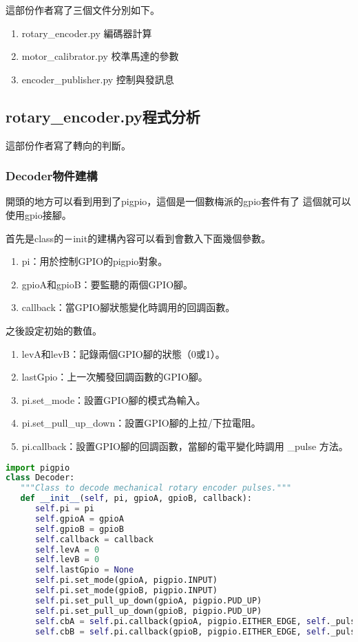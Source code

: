 這部份作者寫了三個文件分別如下。
\begin{enumerate}
    \item rotary\_encoder.py 編碼器計算
    \item motor\_calibrator.py 校準馬達的參數
    \item encoder\_publisher.py 控制與發訊息
\end{enumerate}

\subsection{rotary\_encoder.py程式分析 }
這部份作者寫了轉向的判斷。
\subsubsection{Decoder物件建構}
開頭的地方可以看到用到了pigpio，這個是一個數梅派的gpio套件有了
這個就可以使用gpio接腳。

首先是class的－init的建構內容可以看到會數入下面幾個參數。
\begin{enumerate}
    \item pi：用於控制GPIO的pigpio對象。
    \item gpioA和gpioB：要監聽的兩個GPIO腳。
    \item callback：當GPIO腳狀態變化時調用的回調函數。
\end{enumerate}
之後設定初始的數值。
\begin{enumerate}
    \item levA和levB：記錄兩個GPIO腳的狀態（0或1）。
    \item lastGpio：上一次觸發回調函數的GPIO腳。
    \item pi.set\_mode：設置GPIO腳的模式為輸入。
    \item pi.set\_pull\_up\_down：設置GPIO腳的上拉/下拉電阻。
    \item pi.callback：設置GPIO腳的回調函數，當腳的電平變化時調用 \_pulse 方法。
\end{enumerate}

\begin{lstlisting}[language=Python, caption=開頭建立編碼器]
import pigpio
class Decoder:
   """Class to decode mechanical rotary encoder pulses."""
   def __init__(self, pi, gpioA, gpioB, callback):
      self.pi = pi
      self.gpioA = gpioA
      self.gpioB = gpioB
      self.callback = callback
      self.levA = 0
      self.levB = 0
      self.lastGpio = None
      self.pi.set_mode(gpioA, pigpio.INPUT)
      self.pi.set_mode(gpioB, pigpio.INPUT)
      self.pi.set_pull_up_down(gpioA, pigpio.PUD_UP)
      self.pi.set_pull_up_down(gpioB, pigpio.PUD_UP)
      self.cbA = self.pi.callback(gpioA, pigpio.EITHER_EDGE, self._pulse)
      self.cbB = self.pi.callback(gpioB, pigpio.EITHER_EDGE, self._pulse)
\end{lstlisting}

